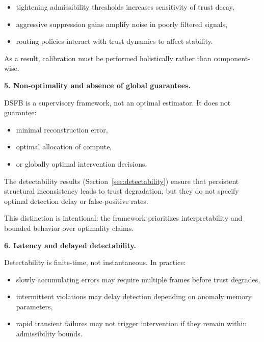 \documentclass[11pt]{article}
\theoremstyle{definition}
\theoremstyle{plain}
\begin{document}
\begin{itemize}[leftmargin=1.5em]
    \item tightening admissibility thresholds increases sensitivity of trust decay,
    \item aggressive suppression gains amplify noise in poorly filtered signals,
    \item routing policies interact with trust dynamics to affect stability.
\end{itemize}

As a result, calibration must be performed holistically rather than component-wise.

\vspace{0.5em}
\noindent
\textbf{5. Non-optimality and absence of global guarantees.}

DSFB is a supervisory framework, not an optimal estimator. It does not guarantee:

\begin{itemize}[leftmargin=1.5em]
    \item minimal reconstruction error,
    \item optimal allocation of compute,
    \item or globally optimal intervention decisions.
\end{itemize}

The detectability results (Section~\ref{sec:detectability}) ensure that persistent structural inconsistency leads to trust degradation, but they do not specify optimal detection delay or false-positive rates.

This distinction is intentional: the framework prioritizes interpretability and bounded behavior over optimality claims.

\vspace{0.5em}
\noindent
\textbf{6. Latency and delayed detectability.}

Detectability is finite-time, not instantaneous. In practice:

\begin{itemize}[leftmargin=1.5em]
    \item slowly accumulating errors may require multiple frames before trust degrades,
    \item intermittent violations may delay detection depending on anomaly memory parameters,
    \item rapid transient failures may not trigger intervention if they remain within admissibility bounds.
\end{itemize}
\end{document}
